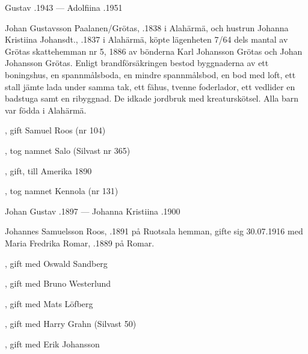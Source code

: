 Gustav .1943  ---  Adolfiina .1951


Johan Gustavsson Paalanen/Grötas, .1838 i Alahärmä, och hustrun Johanna Kristiina Johansdt., .1837 i Alahärmä, köpte lägenheten 7/64 dels mantal av Grötas skattehemman  nr 5, 1886 av bönderna Karl Johansson Grötas och Johan Johansson Grötas. Enligt brandförsäkringen bestod byggnaderna av ett boningshus, en spannmålsboda, en mindre spannmålsbod, en bod med loft, ett stall jämte lada under samma tak, ett fähus, tvenne foderlador, ett vedlider en badstuga samt en ribyggnad. De idkade jordbruk med kreaturskötsel. Alla barn var födda i Alahärmä.
\begin{jhchildren}
  \item {}
  \item {}
  \item {}, gift Samuel Roos (nr 104)
  \item {}, tog namnet Salo (Silvast nr 365)
  \item {}
  \item {}, gift, till Amerika 1890
  \item {}
  \item {}, tog namnet Kennola (nr 131)
\end{jhchildren}
Johan Gustav .1897  ---  Johanna Kristiina .1900






Johannes Samuelsson Roos, .1891 på Ruotsala hemman, gifte sig 30.07.1916 med Maria Fredrika Romar, .1889 på Romar.
\begin{jhchildren}
  \item {}, gift med Oswald Sandberg
  \item {}, gift med Bruno Westerlund
  \item {}, gift med Mats Löfberg
  \item {}, gift med Harry Grahn (Silvast 50)
  \item {}, gift med Erik Johansson
\end{jhchildren}

